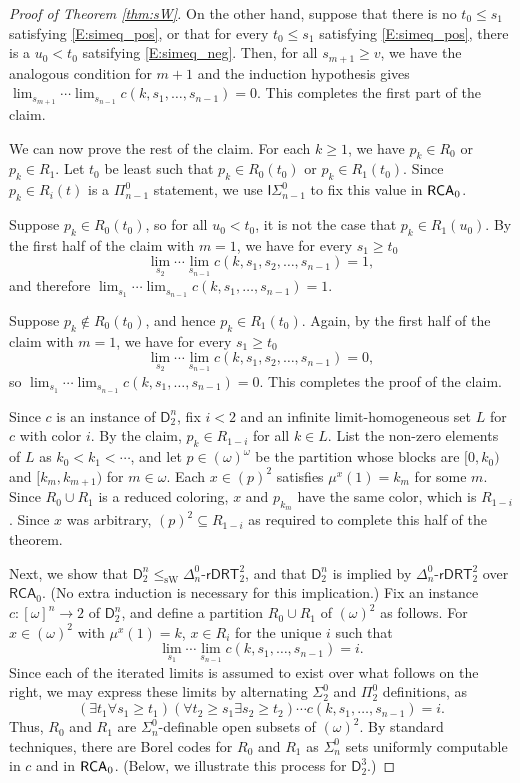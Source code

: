\documentclass{amsart}
\theoremstyle{definition}
\theoremstyle{remark}
\newcommand{\system}[1]{\mbox{\fontfamily{cmss}\fontshape{n}\fontseries{m}%
    \selectfont#1}}
\newcommand{\RCA}{\system{RCA}\ensuremath{_0}}
\begin{document}
\begin{proof}[Proof of Theorem \ref{thm:sW}]
On the other hand, suppose that there is no $t_0 \leq s_1$ satisfying \eqref{E:simeq_pos}, or that for every $t_0 \leq s_1$ satisfying \eqref{E:simeq_pos}, there is a $u_0 < t_0$ 
satsifying \eqref{E:simeq_neg}. Then, for all $s_{m+1} \geq v$, we have the analogous condition for $m+1$ and the induction hypothesis gives 
$\lim_{s_{m+1}} \cdots \lim_{s_{n-1}} c(k,s_1, \ldots, s_{n-1}) = 0$. This completes the first part of the claim. 
	
We can now prove the rest of the claim. For each $k \geq 1$, we have $p_k \in R_0$ or $p_k \in R_1$. Let $t_0$ be least such that 
$p_k \in R_0(t_0)$ or $p_k \in R_1(t_0)$. Since $p_k \in R_i(t)$ is a $\Pi^0_{n-1}$ statement, we use $\mathsf{I}\Sigma^0_{n-1}$ to 
fix this value in $\RCA$. 

Suppose $p_k \in R_0(t_0)$, so for all $u_0 < t_0$, it is not the case that $p_k \in R_1(u_0)$. By the first half of the claim with $m=1$, we have for every $s_1 \geq t_0$
	\[
		\lim_{s_2} \cdots \lim_{s_{n-1}} c(k,s_1,s_2,\ldots,s_{n-1}) = 1,
	\]
and therefore $\lim_{s_1} \cdots \lim_{s_{n-1}} c(k,s_1,\ldots,s_{n-1}) = 1$. 

Suppose $p_k \not \in R_0(t_0)$, and hence $p_k \in R_1(t_0)$. Again, by the first half of the claim with $m=1$, we have for every $s_1 \geq t_0$
	\[
		\lim_{s_2} \cdots \lim_{s_{n-1}} c(k,s_1,s_2,\ldots,s_{n-1}) = 0,
	\]
so $\lim_{s_1} \cdots \lim_{s_{n-1}} c(k,s_1,\ldots,s_{n-1}) = 0$.  This completes the proof of the claim.
	
Since $c$ is an instance of $\mathsf{D}^n_2$, fix $i < 2$ and an infinite limit-homogeneous set $L$ for $c$ with color $i$. By the claim, 
$p_k \in R_{1-i}$ for all $k \in L$. List the non-zero elements of $L$ as $k_0 < k_1 < \cdots$, and let $p \in (\omega)^\omega$ be the partition whose blocks are $[0,k_0)$ and  
$[k_m,k_{m+1})$ for $m \in \omega$. Each $x \in (p)^2$ satisfies $\mu^x(1) = k_m$ for some $m$. Since $R_0 \cup R_1$ is a reduced coloring, 
$x$ and $p_{k_m}$ have the same color, which is $R_{1-i}$. Since $x$ was arbitrary, $(p)^2 \subseteq R_{1-i}$ as required to complete this half of the theorem.
	
Next, we show that $\mathsf{D}^n_2 \leq_{\mathrm{sW}} \Delta^0_n$-$\mathsf{rDRT}^2_2$, and that $\mathsf{D}^n_2$ is implied 
by $\Delta^0_n$-$\mathsf{rDRT}^2_2$ over $\mathsf{RCA}_0$. (No extra induction is necessary for this implication.) Fix an instance $c : [\omega]^n \to 2$ of $\mathsf{D}^n_2$, 
and define a partition $R_0 \cup R_1$ of $(\omega)^2$ as follows. For $x \in (\omega)^2$ with $\mu^x(1) = k$, $x \in R_i$ for the unique $i$ such that
	\[
		\lim_{s_1} \cdots \lim_{s_{n-1}} c(k,s_1,\ldots,s_{n-1}) = i.
	\]
Since each of the iterated limits is assumed to exist over what follows on the right, we may express these limits by alternating $\Sigma^0_2$ and $\Pi^0_2$ definitions, as
	\[
		(\exists t_1 \forall s_1 \geq t_1) (\forall t_2 \geq s_1 \exists s_2 \geq t_2) \cdots c(k,s_1,\ldots,s_{n-1}) = i.
	\]
Thus, $R_0$ and $R_1$ are $\Sigma^0_n$-definable open subsets of $(\omega)^2$. By standard techniques, there are Borel codes for $R_0$ and $R_1$ as $\Sigma^0_n$ sets 
uniformly computable in $c$ and in $\RCA$. (Below, we illustrate this process for $\mathsf{D}^3_2$.)


\end{proof}
\end{document}
